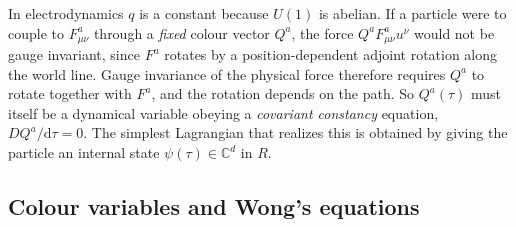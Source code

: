 \documentclass[11pt,a4paper]{book}
\numberwithin{equation}{section}
\newcommand{\dd}{\mathrm{d}}
\theoremstyle{definition}
\theoremstyle{remark}
\begin{document}
In electrodynamics $q$ is a constant because $U(1)$ is abelian.  If a
particle were to couple to $F^a_{\mu\nu}$ through a \emph{fixed} colour
vector $Q^a$, the force $Q^aF^a_{\mu\nu}u^\nu$ would not be gauge invariant,
since $F^a$ rotates by a position-dependent adjoint rotation along the
world line.  Gauge invariance of the physical force therefore requires $Q^a$
to rotate together with $F^a$, and the rotation depends on the path.  So
$Q^a(\tau)$ must itself be a dynamical variable obeying a
\emph{covariant constancy} equation, $DQ^a/\dd\tau=0$.  The simplest
Lagrangian that realizes this is obtained by giving the particle an
internal state $\psi(\tau)\in\mathbb C^d$ in $R$.

\subsection{Colour variables and Wong's equations}\label{sec:wong}
\end{document}

